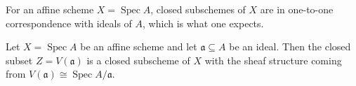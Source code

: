 \documentclass[12pt]{book}
\theoremstyle{definition}
\DeclarePairedDelimiter{\Set}{\lbrace}{\rbrace}
\DeclareMathOperator{\Spec}{Spec}
\begin{document}
	For an affine scheme $X = \Spec A$, closed subschemes of $X$ are in one-to-one correspondence with ideals of $A$, which is what one expects.
	
	\begin{proposition}
		Let $X = \Spec A$ be an affine scheme and let $\mathfrak{a} \subseteq A$ be an ideal. Then the closed subset $Z = V(\mathfrak{a})$ is a closed subscheme of $X$ with the sheaf structure coming from $V(\mathfrak{a}) \cong \Spec A/\mathfrak{a}$.
	\end{proposition}
	
%		
\end{document}
